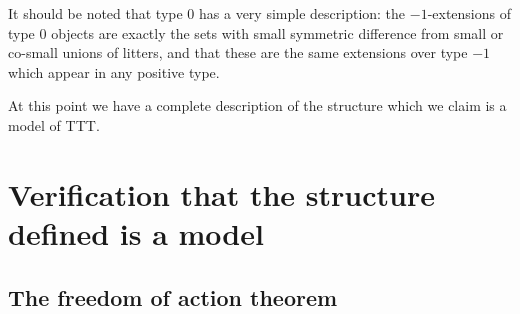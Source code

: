 \documentclass[112pt]{article}
\begin{document}
\begin{description}
   It should be noted that type 0 has a very simple description:  the $-1$-extensions of type 0 objects are exactly the sets with small symmetric difference from small or co-small unions of litters, and that these are the same extensions over type $-1$ which appear in any positive type.




\begin{comment}

NOTE TO SELF:  write out the back and forth argument in more detail for communication with Sky

\end{comment}

At this point we have a complete description of the structure which we claim is a model of TTT.


\end{description}

\section{Verification that the structure defined is a model}

\subsection{The freedom of action theorem}
\end{document}
